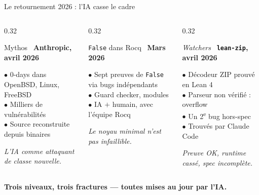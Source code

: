 \documentclass[aspectratio=169]{beamer}
\begin{document}
\begin{frame}{Le retournement 2026 : l'IA casse le cadre}
  \begin{columns}[T]
    \begin{column}{0.32\textwidth}
      \begin{block}{Mythos~\cite{anthropic2026mythos}}
        \scriptsize
        \textbf{Anthropic, avril 2026}
        \smallskip

        $\bullet$ 0-days dans OpenBSD, Linux, FreeBSD\\
        $\bullet$ Milliers de vulnérabilités\\
        $\bullet$ Source reconstruite depuis binaires
      \end{block}
      \scriptsize\emph{L'IA comme attaquant de classe nouvelle.}
    \end{column}
    \begin{column}{0.32\textwidth}
      \begin{alertblock}{\texttt{False} dans Rocq~\cite{rocqfalse2026,sterin2026falsehood}}
        \scriptsize
        \textbf{Mars 2026}
        \smallskip

        $\bullet$ Sept preuves de \texttt{False} via bugs indépendants\\
        $\bullet$ Guard checker, modules\\
        $\bullet$ IA $+$ humain, avec l'équipe Rocq
      \end{alertblock}
      \scriptsize\emph{Le noyau minimal n'est pas infaillible.}
    \end{column}
    \begin{column}{0.32\textwidth}
      \begin{exampleblock}{\emph{Watchers}~\cite{gopinathan2026watchers}}
        \scriptsize
        \textbf{\texttt{lean-zip}, avril 2026}
        \smallskip

        $\bullet$ Décodeur ZIP prouvé en Lean 4\\
        $\bullet$ Parseur non vérifié : overflow\\
        $\bullet$ Un 2\textsuperscript{e} bug hors-spec\\
        $\bullet$ Trouvés par Claude Code
      \end{exampleblock}
      \scriptsize\emph{Preuve OK, runtime cassé, spec incomplète.}
    \end{column}
  \end{columns}
  \medskip
  \begin{center}
    \textbf{Trois niveaux, trois fractures --- toutes mises au jour par l'IA.}
  \end{center}
\end{frame}
\end{document}
